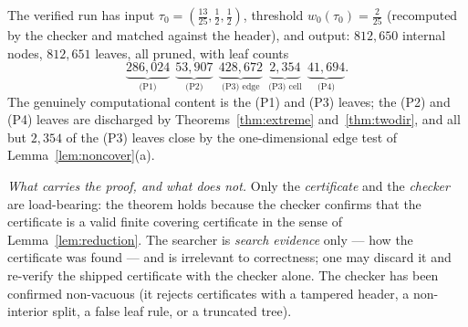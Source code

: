 \documentclass{aims}
\numberwithin{equation}{section}
\theoremstyle{plain}
\theoremstyle{definition}
\theoremstyle{remark}
\begin{document}
The verified run has input $\tau_0=(\tfrac{13}{25},\tfrac12,\tfrac12)$,
threshold $w_0(\tau_0)=\tfrac2{25}$ (recomputed by the checker and matched
against the header), and output: $812{,}650$ internal nodes, $812{,}651$
leaves, all pruned, with leaf counts
\[
\underbrace{286{,}024}_{\text{(P1)}}\ \
\underbrace{53{,}907}_{\text{(P2)}}\ \
\underbrace{428{,}672}_{\text{(P3) edge}}\ \
\underbrace{2{,}354}_{\text{(P3) cell}}\ \
\underbrace{41{,}694}_{\text{(P4)}} .
\]
The genuinely computational content is the (P1) and (P3) leaves; the (P2) and
(P4) leaves are discharged by Theorems~\ref{thm:extreme} and~\ref{thm:twodir},
and all but $2{,}354$ of the (P3) leaves close by the one-dimensional edge test
of Lemma~\ref{lem:noncover}(a).

\emph{What carries the proof, and what does not.} Only the \emph{certificate}
and the \emph{checker} are load-bearing: the theorem holds because the checker
confirms that the certificate is a valid finite covering certificate in the
sense of Lemma~\ref{lem:reduction}. The searcher is \emph{search evidence}
only --- how the certificate was found --- and is irrelevant to correctness;
one may discard it and re-verify the shipped certificate with the checker
alone. The checker has been confirmed non-vacuous (it rejects certificates with
a tampered header, a non-interior split, a false leaf rule, or a truncated
tree).
\end{document}

